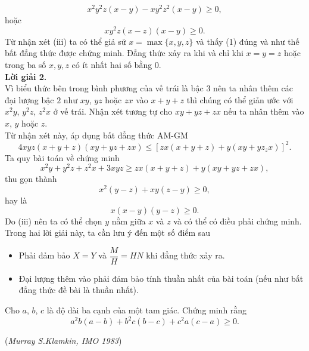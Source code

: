 {\begin{vd}
{		$$x^2y^2z(x-y)-xy^2z^2(x-y)\ge 0,$$
		hoặc
		\[xy^2z(x-z)(x-y)\ge 0.\tag{1}\]
		Từ nhận xét (iii) ta có thể giả sử $x=\max\{ x,y,z\}$ và thấy (1) đúng và như thế bất đẳng thức được chứng minh. Đẳng thức xảy ra khi và chỉ khi $x=y=z$ hoặc trong ba số $x,y,z$ có ít nhất hai số bằng $0$.\\
		\textbf{Lời giải 2.}\\
		Vì biểu thức bên trong bình phương của vế trái  là bậc $3$ nên ta nhân thêm các đại lượng bậc $2$ như $xy$, $yz$ hoặc $zx$ vào $x+y+z$ thì chúng có thể giản ước với $x^2y$, $y^2z$, $z^2x$ ở vế trái. Nhận xét tương tự cho $xy+yz+zx$ nếu ta nhân thêm vào $x$, $y$ hoặc $z$.\\
		Từ nhận xét này, áp dụng bất đẳng thức AM-GM
		$$4xyz(x+y+z)(xy+yz+zx)\le \left[zx(x+y+z)+y(xy+yz_zx)\right]^2.$$
		Ta quy bài toán về chứng minh 
		$$x^2y+y^2z+z^2x+3xyz\ge zx(x+y+z)+y(xy+yz+zx),$$ 
		thu gọn thành
		$$x^2(y-z)+xy(z-y)\ge 0,$$
		hay là $$x(x-y)(y-z)\ge 0.$$
		Do (iii) nên ta có thể chọn  $y$ nằm giữa $x$ và $z$ và có thể có điều phải chứng minh.\\
		 Trong hai lời giải này, ta cần lưu ý đến một số điểm sau
		\begin{itemize}
			\item Phải đảm bảo $X=Y$ và $\dfrac{M}{H}=HN$ khi đẳng thức xảy ra.
			\item Đại lượng thêm vào phải đảm bảo tính thuần nhất của bài toán (nếu như bất đẳng thức đề bài là thuần nhất).
		\end{itemize}
	}
\end{vd}
\begin{vd}%
	Cho $a$, $b$, $c$ là độ dài ba cạnh của một tam giác. Chứng minh rằng 
	\[a^2b(a-b)+b^2c(b-c)+c^2a(c-a)\ge 0.\tag{2}\]
	\begin{flushright}
		(\textit{Murray S.Klamkin, IMO 1983})
	\end{flushright}
\end{vd}}

